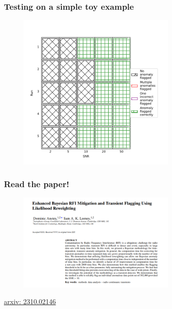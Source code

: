 \documentclass{beamer}
\begin{document}
      \begin{frame}
        \frametitle{Testing on a simple toy example}
        \begin{figure}
            \includegraphics[width=0.7\textwidth]{transient_dom.png}
        \end{figure}
      \end{frame}

      \begin{frame}
        \frametitle{Read the paper!}
        \begin{figure}
        \includegraphics[width=0.7\textwidth]{da_sl_paper.png}
      \end{figure}
      \href{https://arxiv.org/abs/2310.02146}{arxiv: 2310.02146}

      \end{frame}
\end{document}
